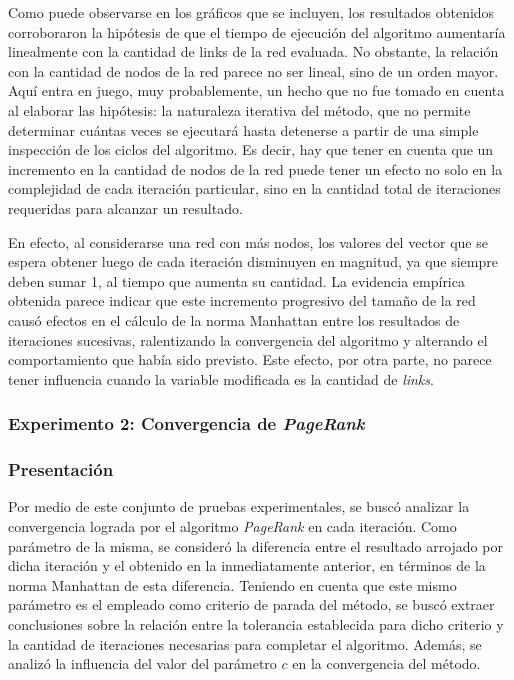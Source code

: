             Como puede observarse en los gráficos que se incluyen, los resultados obtenidos corroboraron la hipótesis de que el tiempo de ejecución del algoritmo aumentaría linealmente con la cantidad de links de la red evaluada. No obstante, la relación con la cantidad de nodos de la red parece no ser lineal, sino de un orden mayor. Aquí entra en juego, muy probablemente, un hecho que no fue tomado en cuenta al elaborar las hipótesis: la naturaleza iterativa del método, que no permite determinar cuántas veces se ejecutará hasta detenerse a partir de una simple inspección de los ciclos del algoritmo. Es decir, hay que tener en cuenta que un incremento en la cantidad de nodos de la red puede tener un efecto no solo en la complejidad de cada iteración particular, sino en la cantidad total de iteraciones requeridas para alcanzar un resultado.

            En efecto, al considerarse una red con más nodos, los valores del vector que se espera obtener luego de cada iteración disminuyen en magnitud, ya que siempre deben sumar 1, al tiempo que aumenta su cantidad. La evidencia empírica obtenida parece indicar que este incremento progresivo del tamaño de la red causó efectos en el cálculo de la norma Manhattan entre los resultados de iteraciones sucesivas, ralentizando la convergencia del algoritmo y alterando el comportamiento que había sido previsto. Este efecto, por otra parte, no parece tener influencia cuando la variable modificada es la cantidad de \emph{links}.

        \subsubsection{Experimento 2: Convergencia de \emph{PageRank}}

            \subsubsection*{Presentación}
            Por medio de este conjunto de pruebas experimentales, se buscó analizar la convergencia lograda por el algoritmo \emph{PageRank} en cada iteración. Como parámetro de la misma, se consideró la diferencia entre el resultado arrojado por dicha iteración y el obtenido en la inmediatamente anterior, en términos de la norma Manhattan de esta diferencia. Teniendo en cuenta que este mismo parámetro es el empleado como criterio de parada del método, se buscó extraer conclusiones sobre la relación entre la tolerancia establecida para dicho criterio y la cantidad de iteraciones necesarias para completar el algoritmo. Además, se analizó la influencia del valor del parámetro $c$ en la convergencia del método.

